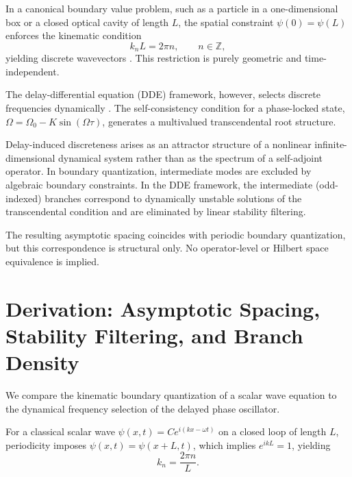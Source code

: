\documentclass[pdflatex,sn-mathphys-num]{sn-jnl}
\begin{document}
        In a canonical boundary value problem, such as a particle in a one-dimensional box or a closed optical cavity of length $L$, the spatial constraint $\psi(0)=\psi(L)$ enforces the kinematic condition
        \begin{equation}
            k_n L = 2\pi n, \qquad n\in\mathbb{Z},
            \label{eq:kinematic_condition}
        \end{equation}
        yielding discrete wavevectors \cite{Griffiths2018,Siegman1986}. This restriction is purely geometric and time-independent.

        The delay-differential equation (DDE) framework, however, selects discrete frequencies dynamically \cite{Hale1993,Diekmann1995,Erneux2009}.
        The self-consistency condition for a phase-locked state, $\Omega = \Omega_0 - K \sin(\Omega \tau)$, generates a multivalued transcendental root structure.

        Delay-induced discreteness arises as an attractor structure of a nonlinear infinite-dimensional dynamical system rather than as the spectrum of a self-adjoint operator.
        In boundary quantization, intermediate modes are excluded by algebraic boundary constraints.
        In the DDE framework, the intermediate (odd-indexed) branches correspond to dynamically unstable solutions of the transcendental condition and are eliminated by linear stability filtering.

        The resulting asymptotic spacing coincides with periodic boundary quantization, but this correspondence is structural only.
        No operator-level or Hilbert space equivalence is implied.

    \section{Derivation: Asymptotic Spacing, Stability Filtering, and Branch Density}

        We compare the kinematic boundary quantization of a scalar wave equation to the dynamical frequency selection of the delayed phase oscillator.

        For a classical scalar wave $\psi(x,t) = C e^{i(kx-\omega t)}$ on a closed loop of length $L$, periodicity imposes $\psi(x,t)=\psi(x+L,t)$, which implies $e^{ikL}=1$, yielding
        \begin{equation}
            k_n=\frac{2\pi n}{L}.
            \label{eq:k_n}
        \end{equation}
\end{document}
